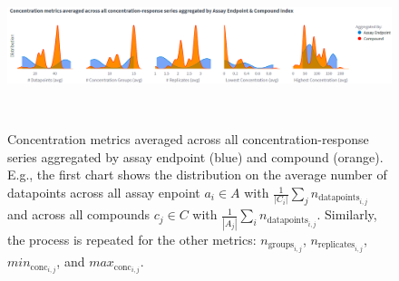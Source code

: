 \begin{figure}[htbp]  %
    \centering
    \includegraphics[width=1.0\textwidth]{figures/concentration_metric_distributions.png}  
    \caption{Concentration metrics averaged across all concentration-response series aggregated by assay endpoint (blue) and compound (orange). E.g., the first chart shows the distribution on the average number of datapoints across all assay enpoint $a_i \in A$ with $\frac{1}{|C_i|} \sum_{j} n_{\text{datapoints}_{i,j}}$ and across all compounds $c_j \in C$ with $\frac{1}{|A_j|} \sum_{i} n_{\text{datapoints}_{i,j}}$. Similarly, the process is repeated for the other metrics: $n_{\text{groups}_{i,j}}$, $n_{\text{replicates}_{i,j}}$, $min_{\text{conc}_{i,j}}$, and $max_{\text{conc}_{i,j}}$.
    }
~\label{fig:concentration_metric_distributions} 
\end{figure}


